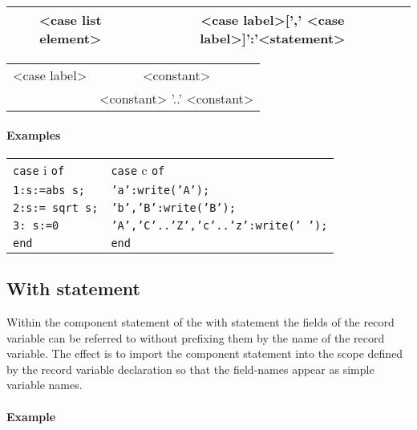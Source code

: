 {\vspace{0.3cm}
{\centering \begin{tabular}{|c|c|}
\hline 
<case list element>&
<case label>{[}',' <case label>{]}':'<statement>\\
\hline 
\end{tabular}\par}
\vspace{0.3cm}

\vspace{0.3cm}
{\centering \begin{tabular}{|c|c|}
\hline 
<case label>&
<constant>\\
&
<constant> '..' <constant>\\
\hline 
\end{tabular}\par}
\vspace{0.3cm}


\paragraph{Examples}

\vspace{0.3cm}
{\raggedright \begin{tabular}{ll}
\texttt{case} i \texttt{of}&
\texttt{case} c \texttt{of}\\
\texttt{1:s:=abs s;}&
\texttt{'a':write('A');}\\
\texttt{2:s:= sqrt s;}&
\texttt{'b','B':write('B');}\\
\texttt{3: s:=0}&
\texttt{'A','C'..'Z','c'..'z':write(' ');}\\
\texttt{end}&
\texttt{end}\\
\end{tabular}\par}
\vspace{0.3cm}


\subsection{With statement}

Within the component statement of the with statement the fields
of the record variable can be referred to without prefixing them by the name
of the record variable. The effect is to import the component statement into
the scope defined by the record variable declaration so that
the field-names appear as simple variable names.


\paragraph{Example}

}
